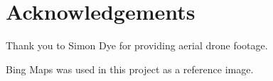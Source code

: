 \section{Acknowledgements}
Thank you to Simon Dye for providing aerial drone footage.

Bing Maps was used in this project as a reference image.

